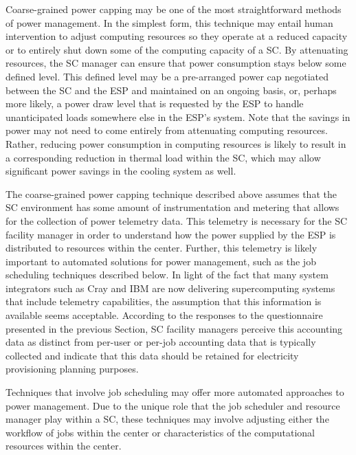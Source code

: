 Coarse-grained power capping may be one of the most straightforward
methods of power management. In the simplest form, this technique may
entail human intervention to adjust computing resources so they
operate at a reduced capacity or to entirely shut down some of the
computing capacity of a SC. By attenuating
resources, the SC manager can ensure that power
consumption stays below some defined level. This defined level may be
a pre-arranged power cap negotiated between the SC
and the ESP and maintained on an ongoing basis,
or, perhaps more likely, a power draw level that is requested by the
ESP to handle unanticipated loads somewhere else
in the ESP's system. 
Note that the savings
in power may not need to come entirely from attenuating computing
resources. Rather, reducing power consumption in computing resources
is likely to result in a corresponding reduction in thermal load
within the SC, which
may allow significant power savings in the cooling system as well.

The coarse-grained power capping technique described above assumes
that the SC environment has some amount of
instrumentation and metering that allows for the collection of power
telemetry data. This telemetry is necessary for the SC facility manager in order to understand how the power supplied
by the ESP is distributed to resources within the
center. Further, this telemetry is likely important to automated
solutions for power management, such as the job scheduling techniques
described below. In light of the fact that many system integrators
such as Cray and IBM are now delivering supercomputing systems that
include telemetry capabilities, the assumption that this information
is available seems acceptable. According to the responses to the
questionnaire presented in the previous Section, SC
facility managers perceive this accounting data as distinct from
per-user or per-job accounting data that is typically collected and
indicate that this data should be retained for electricity
provisioning planning purposes.

Techniques that involve job scheduling may offer more automated
approaches to power management. Due to the unique role that the job
scheduler and resource manager play within a SC,
these techniques may involve adjusting either the workflow of jobs
within the center or characteristics of the computational resources
within the center.

